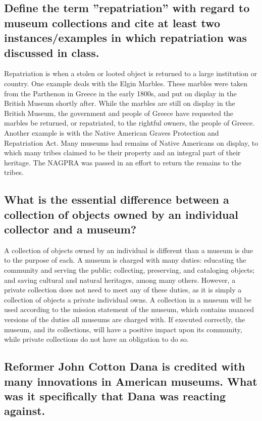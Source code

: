 \documentclass[11pt]{article}
\begin{document}
\singlespacing
\subsection*{Define the term ''repatriation'' with regard to museum collections and cite at least two instances/examples in which repatriation was discussed in class.}

\doublespacing
Repatriation is when a stolen or looted object is returned to a large institution or country. One example deals with the Elgin Marbles. These marbles were taken from the Parthenon in Greece in the early 1800s, and put on display in the British Museum shortly after. While the marbles are still on display in the British Museum, the government and people of Greece have requested the marbles be returned, or repatriated, to the rightful owners, the people of Greece. Another example is with the Native American Graves Protection and Repatriation Act. Many museums had remains of Native Americans on display, to which many tribes claimed to be their property and an integral part of their heritage. The NAGPRA was passed in an effort to return the remains to the tribes.

\singlespacing
\subsection*{What is the essential difference between a collection of objects owned by an individual collector and a museum?}

\doublespacing
A collection of objects owned by an individual is different than a museum is due to the purpose of each. A museum is charged with many duties: educating the community and serving the public; collecting, preserving, and cataloging objects; and saving cultural and natural heritages, among many others. However, a private collection does not need to meet any of these duties, as it is simply a collection of objects a private individual owns. A collection in a museum will be used according to the mission statement of the museum, which contains nuanced versions of the duties all museums are charged with. If executed correctly, the museum, and its collections, will have a positive impact upon its community, while private collections do not have an obligation to do so.

\singlespacing
\subsection*{Reformer John Cotton Dana is credited with many innovations in American museums. What was it specifically that Dana was reacting against.}
\end{document}
